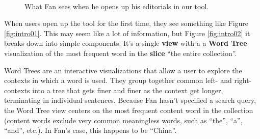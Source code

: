 \documentclass{sig-alternate}
\newcommand{\strong}[1] {\textbf{#1}}
\begin{document}
\begin{figure}[ht!]
\begin{center}
%
        \\
%
    \end{center}
    \caption{%
        What Fan sees when he opens up his editorials in our tool.
     }%
\end{figure}

When users open up the tool for the first time, they see something like Figure \ref{fig:intro01}. This may seem like a lot of information, but Figure \ref{fig:intro02} it breaks down into simple components. It's a single \strong{view} with a a \strong{Word Tree} visualization of the most frequent word in the \strong{slice} ``the entire collection''. 

Word Trees \cite{wattenberg_word_2008} are an interactive visualizations that allow a user to explore the contexts in which a word is used. They group together common left- and right-contexts into a tree that gets finer and finer as the context get longer, terminating in individual sentences.  Because Fan hasn't specified a search query, the Word Tree view centers on the most frequent content word in the collection (content words exclude very common meaningless words, such as ``the'', ``a'', ``and'', etc.). In Fan's case, this happens to be ``China''.
\end{document}
